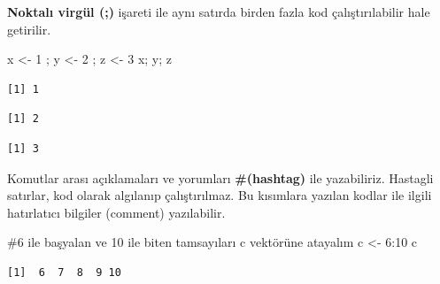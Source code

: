\documentclass[
  letterpaper,
  DIV=11,
  numbers=noendperiod]{scrreprt}
\newenvironment{Shaded}{\begin{snugshade}}{\end{snugshade}}
\newcommand{\CommentTok}[1]{\textcolor[rgb]{0.37,0.37,0.37}{#1}}
\newcommand{\DecValTok}[1]{\textcolor[rgb]{0.68,0.00,0.00}{#1}}
\newcommand{\NormalTok}[1]{\textcolor[rgb]{0.00,0.23,0.31}{#1}}
\newcommand{\OtherTok}[1]{\textcolor[rgb]{0.00,0.23,0.31}{#1}}
\newcommand{\SpecialCharTok}[1]{\textcolor[rgb]{0.37,0.37,0.37}{#1}}
\begin{document}
\textbf{Noktalı virgül (;)} işareti ile aynı satırda birden fazla kod
çalıştırılabilir hale getirilir.

\begin{Shaded}
\begin{Highlighting}[]
\NormalTok{x }\OtherTok{\textless{}{-}} \DecValTok{1}\NormalTok{ ; y }\OtherTok{\textless{}{-}} \DecValTok{2}\NormalTok{ ; z }\OtherTok{\textless{}{-}} \DecValTok{3}  
\NormalTok{x; y; z}
\end{Highlighting}
\end{Shaded}

\begin{verbatim}
[1] 1
\end{verbatim}

\begin{verbatim}
[1] 2
\end{verbatim}

\begin{verbatim}
[1] 3
\end{verbatim}

Komutlar arası açıklamaları ve yorumları \textbf{\#(hashtag)} ile
yazabiliriz. Hastagli satırlar, kod olarak algılanıp çalıştırılmaz. Bu
kısımlara yazılan kodlar ile ilgili hatırlatıcı bilgiler (comment)
yazılabilir.

\begin{Shaded}
\begin{Highlighting}[]
\CommentTok{\#6 ile başyalan ve  10 ile  biten tamsayıları c vektörüne atayalım  }
\NormalTok{c }\OtherTok{\textless{}{-}} \DecValTok{6}\SpecialCharTok{:}\DecValTok{10} 
\NormalTok{c}
\end{Highlighting}
\end{Shaded}

\begin{verbatim}
[1]  6  7  8  9 10
\end{verbatim}
\end{document}
